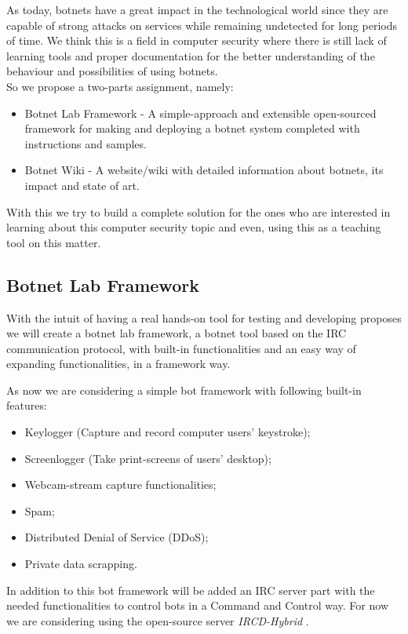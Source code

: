 \documentclass[]{article}
\begin{document}
As today, botnets have a great impact in the technological world since they are capable of strong attacks on services while remaining undetected for long periods of time. We think this is a field in computer security where there is still lack of learning tools and proper documentation for the better understanding of the behaviour and possibilities of using botnets.\\

So we propose a two-parts assignment, namely:
\begin{itemize}
	\item Botnet Lab Framework - A simple-approach and extensible open-sourced framework for making and deploying a botnet system completed with instructions and samples.
	\item Botnet Wiki - A website/wiki with detailed information about botnets, its impact and state of art.
\end{itemize}

With this we try to build a complete solution for the ones who are interested in learning about this computer security topic and even, using this as a teaching tool on this matter.

\subsection{Botnet Lab Framework}

With the intuit of having a real hands-on tool for testing and developing proposes we will create a botnet lab framework, a botnet tool based on the IRC communication protocol, with built-in functionalities and an easy way of expanding functionalities, in a framework way.

As now we are considering a simple bot framework with following built-in features:

\begin{itemize}
	\item Keylogger (Capture and record computer users' keystroke);
	\item Screenlogger (Take print-screens of users' desktop);
	\item Webcam-stream capture functionalities;
	\item Spam;
	\item Distributed Denial of Service (DDoS);
	\item Private data scrapping.
\end{itemize}

In addition to this bot framework will be added an IRC server part with the needed functionalities to control bots in a Command and Control way. For now we are considering using the open-source server \textit{IRCD-Hybrid} \cite{app:ircdhybrid}.
\end{document}
